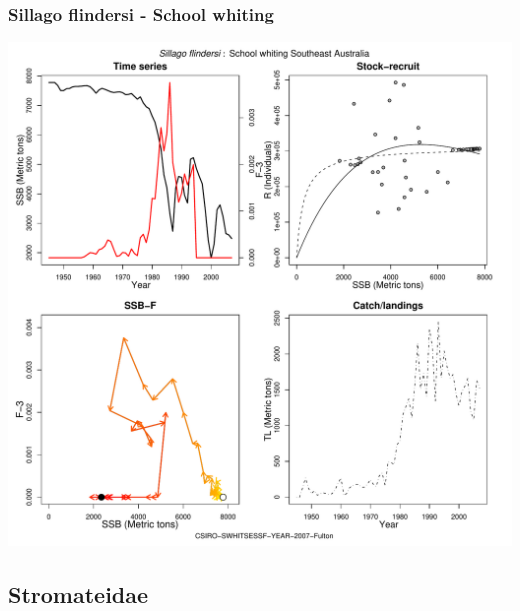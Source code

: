 \subsubsection{Sillago flindersi - School whiting}
\begin{center}
\includegraphics[width=1.2\textwidth]{../R/figures/CSIRO-SWHITSESSF-YEAR-2007-Fulton.pdf}
\end{center}

\subsection{Stromateidae}

